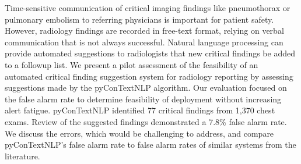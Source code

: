 Time-sensitive communication of critical imaging findings like pneumothorax or pulmonary embolism to referring physicians is important for patient safety. However, radiology findings are recorded in free-text format, relying on verbal communication that is not always successful. Natural language processing can provide automated suggestions to radiologists that new critical findings be added to a followup list. We present a pilot assessment of the feasibility of an automated critical finding suggestion system for radiology reporting by assessing suggestions made by the pyConTextNLP algorithm. Our evaluation focused on the false alarm rate to determine feasibility of deployment without increasing alert fatigue. pyConTextNLP identified 77 critical findings from 1,370 chest exams. Review of the suggested findings demonstrated a 7.8\% false alarm rate. We discuss the errors, which would be challenging to address, and compare pyConTextNLP's false alarm rate to false alarm rates of similar systems from the literature.
